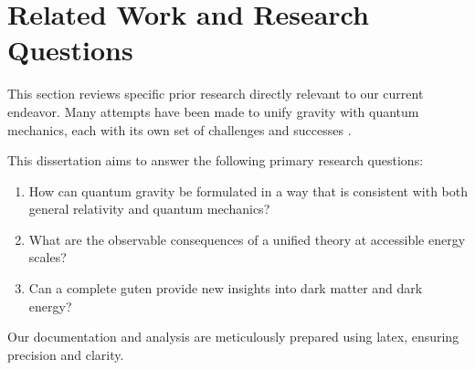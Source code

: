 \section{Related Work and Research Questions}
\label{sec:related-work}
This section reviews specific prior research directly relevant to our current endeavor. Many attempts have been made to unify gravity with quantum mechanics, each with its own set of challenges and successes \citep{Bloggs2021}.

This dissertation aims to answer the following primary research questions:
\begin{enumerate}
    \item How can quantum gravity be formulated in a way that is consistent with both general relativity and quantum mechanics?
    \item What are the observable consequences of a unified theory at accessible energy scales?
    \item Can a complete \gls{guten} provide new insights into dark matter and dark energy?
\end{enumerate}
Our documentation and analysis are meticulously prepared using \gls{latex}, ensuring precision and clarity.
\blindtext[1]
